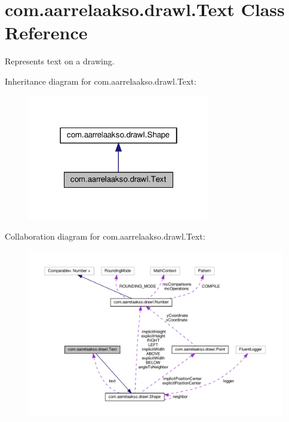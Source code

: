 \hypertarget{classcom_1_1aarrelaakso_1_1drawl_1_1_text}{}\section{com.\+aarrelaakso.\+drawl.\+Text Class Reference}
\label{classcom_1_1aarrelaakso_1_1drawl_1_1_text}


Represents text on a drawing.  




Inheritance diagram for com.\+aarrelaakso.\+drawl.\+Text\+:\nopagebreak
\begin{figure}[H]
\begin{center}
\leavevmode
\includegraphics[width=226pt]{dd/dcf/classcom_1_1aarrelaakso_1_1drawl_1_1_text__inherit__graph}
\end{center}
\end{figure}


Collaboration diagram for com.\+aarrelaakso.\+drawl.\+Text\+:\nopagebreak
\begin{figure}[H]
\begin{center}
\leavevmode
\includegraphics[width=350pt]{df/d69/classcom_1_1aarrelaakso_1_1drawl_1_1_text__coll__graph}
\end{center}
\end{figure}
